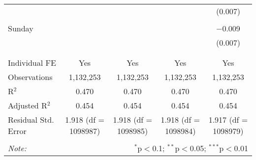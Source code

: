 \documentclass[
]{article}
\begin{document}
\begin{table}[!htbp]
{\begin{tabular}{@{\extracolsep{5pt}}lcccc}
  &  &  &  & (0.007) \\ 
  & & & & \\ 
 Sunday &  &  &  & $-$0.009 \\ 
  &  &  &  & (0.007) \\ 
  & & & & \\ 
\hline \\[-1.8ex] 
Individual FE & Yes & Yes & Yes & Yes \\ 
Observations & 1,132,253 & 1,132,253 & 1,132,253 & 1,132,253 \\ 
R$^{2}$ & 0.470 & 0.470 & 0.470 & 0.470 \\ 
Adjusted R$^{2}$ & 0.454 & 0.454 & 0.454 & 0.454 \\ 
Residual Std. Error & 1.918 (df = 1098987) & 1.918 (df = 1098985) & 1.918 (df = 1098984) & 1.917 (df = 1098979) \\ 
\hline 
\hline \\[-1.8ex] 
\textit{Note:}  & \multicolumn{4}{r}{$^{*}$p$<$0.1; $^{**}$p$<$0.05; $^{***}$p$<$0.01} \\ 
\end{tabular}
} 
\end{table} 
\newpage
\end{document}
